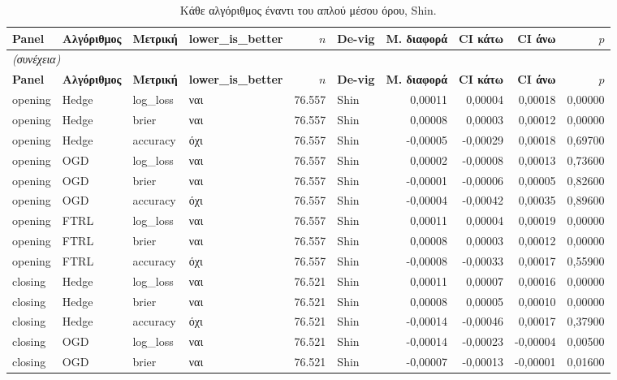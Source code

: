 {\scriptsize
\begin{longtable}{@{}llllrlrrrr@{}}
\caption{Κάθε αλγόριθμος έναντι του απλού μέσου όρου, Shin.}\label{app:vsuniShin}\\
\toprule \textbf{Panel} & \textbf{Αλγόριθμος} & \textbf{Μετρική} & \textbf{lower\_is\_better} & \textbf{$n$} & \textbf{De-vig} & \textbf{Μ. διαφορά} & \textbf{CI κάτω} & \textbf{CI άνω} & \textbf{$p$} \\\midrule\endfirsthead
\multicolumn{10}{l}{\emph{(συνέχεια)}}\\\toprule \textbf{Panel} & \textbf{Αλγόριθμος} & \textbf{Μετρική} & \textbf{lower\_is\_better} & \textbf{$n$} & \textbf{De-vig} & \textbf{Μ. διαφορά} & \textbf{CI κάτω} & \textbf{CI άνω} & \textbf{$p$} \\\midrule\endhead
\bottomrule\endfoot
opening & Hedge & log\_loss & ναι & 76.557 & Shin & 0,00011 & 0,00004 & 0,00018 & 0,00000 \\
opening & Hedge & brier & ναι & 76.557 & Shin & 0,00008 & 0,00003 & 0,00012 & 0,00000 \\
opening & Hedge & accuracy & όχι & 76.557 & Shin & -0,00005 & -0,00029 & 0,00018 & 0,69700 \\
opening & OGD & log\_loss & ναι & 76.557 & Shin & 0,00002 & -0,00008 & 0,00013 & 0,73600 \\
opening & OGD & brier & ναι & 76.557 & Shin & -0,00001 & -0,00006 & 0,00005 & 0,82600 \\
opening & OGD & accuracy & όχι & 76.557 & Shin & -0,00004 & -0,00042 & 0,00035 & 0,89600 \\
opening & FTRL & log\_loss & ναι & 76.557 & Shin & 0,00011 & 0,00004 & 0,00019 & 0,00000 \\
opening & FTRL & brier & ναι & 76.557 & Shin & 0,00008 & 0,00003 & 0,00012 & 0,00000 \\
opening & FTRL & accuracy & όχι & 76.557 & Shin & -0,00008 & -0,00033 & 0,00017 & 0,55900 \\
closing & Hedge & log\_loss & ναι & 76.521 & Shin & 0,00011 & 0,00007 & 0,00016 & 0,00000 \\
closing & Hedge & brier & ναι & 76.521 & Shin & 0,00008 & 0,00005 & 0,00010 & 0,00000 \\
closing & Hedge & accuracy & όχι & 76.521 & Shin & -0,00014 & -0,00046 & 0,00017 & 0,37900 \\
closing & OGD & log\_loss & ναι & 76.521 & Shin & -0,00014 & -0,00023 & -0,00004 & 0,00500 \\
closing & OGD & brier & ναι & 76.521 & Shin & -0,00007 & -0,00013 & -0,00001 & 0,01600 \\

\end{longtable}}
